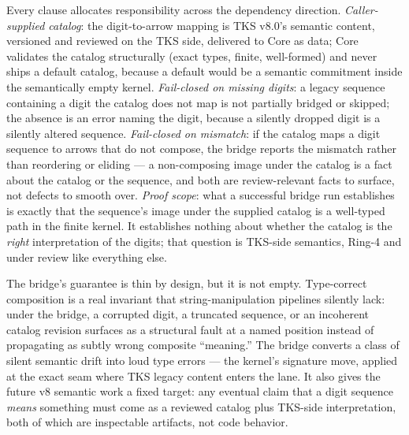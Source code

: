 Every clause allocates responsibility across the dependency direction. \emph{Caller-supplied catalog}: the digit-to-arrow mapping is TKS v8.0's semantic content, versioned and reviewed on the TKS side, delivered to Core as data; Core validates the catalog structurally (exact types, finite, well-formed) and never ships a default catalog, because a default would be a semantic commitment inside the semantically empty kernel. \emph{Fail-closed on missing digits}: a legacy sequence containing a digit the catalog does not map is not partially bridged or skipped; the absence is an error naming the digit, because a silently dropped digit is a silently altered sequence. \emph{Fail-closed on mismatch}: if the catalog maps a digit sequence to arrows that do not compose, the bridge reports the mismatch rather than reordering or eliding --- a non-composing image under the catalog is a fact about the catalog or the sequence, and both are review-relevant facts to surface, not defects to smooth over. \emph{Proof scope}: what a successful bridge run establishes is exactly that the sequence's image under the supplied catalog is a well-typed path in the finite kernel. It establishes nothing about whether the catalog is the \emph{right} interpretation of the digits; that question is TKS-side semantics, Ring-4 and under review like everything else.

\begin{remark}\label{integ:tks:rem}
The bridge's guarantee is thin by design, but it is not empty. Type-correct composition is a real invariant that string-manipulation pipelines silently lack: under the bridge, a corrupted digit, a truncated sequence, or an incoherent catalog revision surfaces as a structural fault at a named position instead of propagating as subtly wrong composite ``meaning.'' The bridge converts a class of silent semantic drift into loud type errors --- the kernel's signature move, applied at the exact seam where TKS legacy content enters the lane. It also gives the future v8 semantic work a fixed target: any eventual claim that a digit sequence \emph{means} something must come as a reviewed catalog plus TKS-side interpretation, both of which are inspectable artifacts, not code behavior.
\end{remark}

